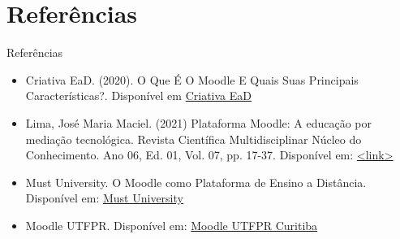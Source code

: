 \documentclass[11pt]{beamer}
\begin{document}
\section{Referências}
	\begin{frame}{Referências}
		\begin{itemize}
			\item Criativa EaD. (2020). O Que É O Moodle E Quais Suas Principais Características?. Disponível em  \href{https://bit.ly/amvb894hg}{Criativa EaD}
			\item Lima, José Maria Maciel. (2021) Plataforma Moodle: A educação por mediação tecnológica. Revista Científica Multidisciplinar Núcleo do Conhecimento. Ano 06, Ed. 01, Vol. 07, pp. 17-37. Disponível em: \href{https://bit.ly/9mb7b2}{<link>} 
			\item Must University. O Moodle como Plataforma de Ensino a Distância. Disponível em: \href{https://edu612tema19v2pt.webflow.io/}{Must University} 
			\item Moodle UTFPR. Disponível em: \href{https://moodle.utfpr.edu.br/login/index.php}{Moodle UTFPR Curitiba}
		\end{itemize}
	\end{frame}
\end{document}
